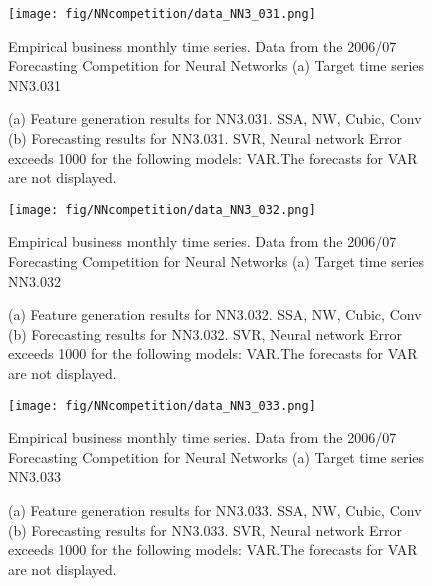 \documentclass[12pt]{article}
\begin{document}
\begin{figure}
\centering
\texttt{[image: fig/NNcompetition/data\_NN3\_031.png]}
\caption{Empirical business monthly time series. Data from the 2006/07 Forecasting Competition for Neural Networks	(a) Target time series	NN3.031	}
\end{figure}


\begin{figure}
\centering
{}
\caption{(a)	Feature generation results for	NN3.031.	SSA, NW, Cubic, Conv	(b)	Forecasting results for	NN3.031.	SVR, Neural network	Error exceeds 1000 for the following models: VAR.The forecasts for VAR are not displayed.	}
\end{figure}


\begin{figure}
\centering
\texttt{[image: fig/NNcompetition/data\_NN3\_032.png]}
\caption{Empirical business monthly time series. Data from the 2006/07 Forecasting Competition for Neural Networks	(a) Target time series	NN3.032	}
\end{figure}


\begin{figure}
\centering
{}
\caption{(a)	Feature generation results for	NN3.032.	SSA, NW, Cubic, Conv	(b)	Forecasting results for	NN3.032.	SVR, Neural network	Error exceeds 1000 for the following models: VAR.The forecasts for VAR are not displayed.	}
\end{figure}


\begin{figure}
\centering
\texttt{[image: fig/NNcompetition/data\_NN3\_033.png]}
\caption{Empirical business monthly time series. Data from the 2006/07 Forecasting Competition for Neural Networks	(a) Target time series	NN3.033	}
\end{figure}


\begin{figure}
\centering
{}
\caption{(a)	Feature generation results for	NN3.033.	SSA, NW, Cubic, Conv	(b)	Forecasting results for	NN3.033.	SVR, Neural network	Error exceeds 1000 for the following models: VAR.The forecasts for VAR are not displayed.	}
\end{figure}
\end{document}
